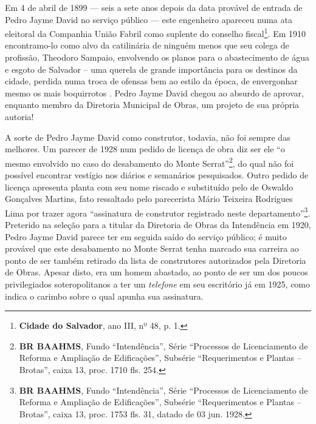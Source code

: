 Em 4 de abril de 1899 --- seis a sete anos depois da data provável de entrada de Pedro Jayme David no serviço público --- este engenheiro apareceu numa ata eleitoral da Companhia União Fabril como suplente do conselho fiscal\footnote{\textbf{Cidade do Salvador}, ano III, nº 48, p. 1.}. Em 1910 encontramo-lo como alvo da catilinária de ninguém menos que seu colega de profissão, Theodoro Sampaio, envolvendo os planos para o abastecimento de água e esgoto de Salvador – uma querela de grande importância para os destinos da cidade, perdida numa troca de ofensas bem ao estilo da época, de envergonhar mesmo os mais boquirrotos \cite{sampaio_agua_1910}. Pedro
Jayme David chegou ao absurdo de aprovar, enquanto membro da Diretoria Municipal de Obras, um projeto de sua própria autoria!

A sorte de Pedro Jayme David como construtor, todavia, não foi sempre das melhores. Um parecer de 1928 num pedido de licença de obra diz ser ele ``o mesmo envolvido no caso do desabamento do Monte Serrat''\footnote{\textbf{BR BAAHMS}, Fundo ``Intendência'', Série ``Processos de Licenciamento de Reforma e Ampliação de Edificações'', Subsérie ``Requerimentos e Plantas – Brotas'', caixa 13, proc. 1710 fls. 254.}, do qual não foi possível encontrar vestígio nos diários e semanários pesquisados. Outro pedido de licença apresenta planta com seu nome riscado e substituído pelo de Oswaldo Gonçalves Martins, fato ressaltado pelo parecerista Mário Teixeira Rodrigues Lima por trazer agora ``assinatura de construtor registrado neste departamento''\footnote{\textbf{BR BAAHMS}, Fundo ``Intendência'', Série ``Processos de Licenciamento de Reforma e Ampliação de Edificações'', Subsérie ``Requerimentos e Plantas – Brotas'', caixa 13, proc. 1753 fls. 31, datado de 03 jun. 1928.}. Preterido na seleção para a titular da Diretoria de Obras da Intendência em 1920, Pedro Jayme David parece ter em seguida saído do serviço público; é muito provável que este desabamento no Monte Serrat tenha marcado sua carreira ao ponto de ser também retirado da lista de construtores autorizados pela Diretoria de Obras. Apesar disto, era um homem abastado, ao ponto de ser um dos poucos privilegiados soteropolitanos a ter um \textit{telefone} em seu escritório já em 1925, como indica o carimbo sobre o qual apunha sua assinatura.

